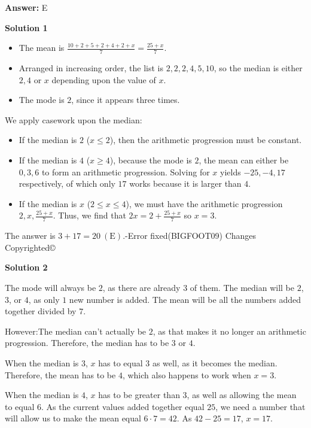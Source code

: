 \begin{enumerate}
 \textbf{Answer: }E



\textbf{Solution 1}


            \begin{itemize}
        \item The mean is $\frac{10+2+5+2+4+2+x}{7} = \frac{25+x}{7}$.
        \item Arranged in increasing order, the list is $2,2,2,4,5,10$, so the median is either $2,4$ or $x$ depending upon the value of $x$.
        \item The mode is $2$, since it appears three times.
            \end{itemize}
            We apply casework upon the median:

 
            \begin{itemize}
        \item If the median is $2$ ($x \le 2$), then the arithmetic progression must be constant.
        \item If the median is $4$ ($x \ge 4$), because the mode is $2$, the mean can either be $0,3,6$ to form an arithmetic progression. Solving for $x$ yields $-25,-4,17$ respectively, of which only $17$ works because it is larger than $4$.
        \item If the median is $x$ ($2 \le x \le 4$), we must have the arithmetic progression $2, x, \frac{25+x}{7}$.  Thus, we find that $2x=2+\frac{25+x}{7}$ so $x=3$.
            \end{itemize}
            The answer is $3 + 17 = \boxed{20\ \mathrm{(E)}}$.-Error fixed(BIGFOOT09) Changes Copyrighted©

 



\textbf{Solution 2}

The mode will always be $2$, as there are already $3$ of them.  The median will be $2$, $3$, or $4$, as only $1$ new number is added.  The mean will be all the numbers added together divided by $7$.

 However:The median can't actually be $2$, as that makes it no longer an arithmetic progression.  Therefore, the median has to be $3$ or $4$.

 When the median is $3$, $x$ has to equal $3$ as well, as it becomes the median.  Therefore, the mean has to be $4$, which also happens to work when $x=3$.

 When the median is $4$, $x$ has to be greater than $3$, as well as allowing the mean to equal $6$.  As the current values added together equal $25$, we need a number that will allow us to make the mean equal $6 \cdot 7 = 42$.  As $42-25=17$, $x=17$.


\end{enumerate}
